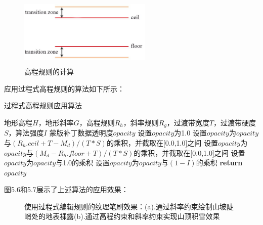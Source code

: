 \begin{figure}[H]
    \centering
    \includegraphics[height=3.4cm ,width=6.3cm]{figures/trans.png}
    \caption{高程规则的计算}
 \end{figure}
应用过程式高程规则的算法如下所示：\par
 \begin{algorithm}[H]
	\renewcommand{\algorithmicrequire}{\textbf{Input:}}
	\renewcommand{\algorithmicensure}{\textbf{Output:}}
	\caption{过程式高程规则应用算法}
	\label{alg:1}
	\begin{algorithmic}[1]
		\REQUIRE 地形高程$H$，地形斜率$G$，高程规则$R_h$，斜率规则$R_g$，过渡带宽度$T$，过渡带硬度$S$，算法强度$I$
		\ENSURE 蒙版补丁数据透明度$opacity$
		\STATE 设置$opacity$为1.0
	    \STATE 设置$opacity$为$opacity$与$(R_h.ceil+T-M_d)/(T*S)$的乘积，并截取在[0.0,1.0]之间
	    \ELSE
	    \STATE 设置$opacity$为$opacity$与$(M_d-R_h.floor+T)/(T*S)$的乘积，并截取在[0.0,1.0]之间
		\ENDIF
	    \STATE 设置$opacity$为$opacity$与1.0的乘积
	    \ELSE
	    \STATE 设置$opacity$为$opacity$与$(1-I)$的乘积
		\ENDIF
		\STATE \textbf{return} $opacity$
	\end{algorithmic}
\end{algorithm}
图5.6和5.7展示了上述算法的应用效果：
\begin{figure}[H]
    \centering
  \caption{使用过程式编辑规则的纹理笔刷效果：(a).通过斜率约束绘制山坡陡峭处的地表裸露(b).通过高程约束和斜率约束实现山顶积雪效果}
\end{figure}

